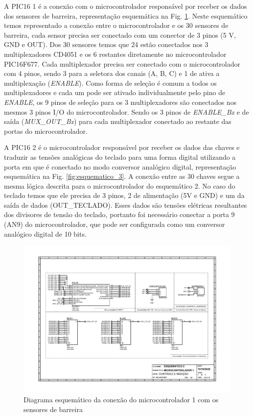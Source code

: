 \begin{apendicesenv}
A PIC16 1 é a conexão com o microcontrolador  responsável por receber os dados dos sensores de barreira, representação esquemática na Fig. \ref{fig:esquematico_2}. Neste esquemático temos representado a conexão entre o microcontrolador e os 30 sensores de barreira, cada sensor precisa ser conectado com um conector de 3 pinos (5 V, GND e OUT). Dos 30 sensores temos que 24 estão conectados nos 3 multiplexadores CD4051 e os 6 restantes diretamente no microcontrolador PIC16F677. Cada multiplexador precisa ser conectado com o microcontrolador com 4 pinos, sendo 3 para a seletora dos canais (A, B, C) e 1 de ativa a multiplexação (\textit{ENABLE}). Como forma de seleção é comum a todos os multiplexadores e cada um pode ser ativado  individualmente pelo pino de \textit{ENABLE}, os 9 pinos de seleção para os 3 multiplexadores são conectados nos mesmos 3 pinos I/O do microcontrolador. Sendo os 3 pinos de \textit{ENABLE\_Bx} e de saída (\textit{MUX\_OUT\_Bx}) para cada multiplexador conectado ao restante das portas do microcontrolador.

A PIC16 2 é o microcontrolador responsável por receber os dados das chaves e traduzir as tensões analógicas do teclado para uma forma digital utilizando a porta em que é conectado no modo conversor analógico digital, representação esquemática na Fig. \ref{fig:esquematico_3}. A conexão entre as 30 chaves segue a mesma lógica descrita para o microcontrolador do esquemático 2. No caso do teclado temos que ele precisa de 3 pinos, 2 de alimentação (5V e GND) e um da saída de dados (OUT\_TECLADO). Esses dados são tensões elétricas resultantes dos divisores de tensão do teclado, portanto foi necessário conectar a porta 9 (AN9) do microcontrolador, que pode ser configurada como um conversor analógico digital de 10 bits.


\begin{landscape}
\begin{figure}[H]
    \centering
    \includegraphics[width=1.25\textwidth, height=2\textheight,keepaspectratio]{figuras/eletronica/esquematicos/esquematico_2_micro1.pdf}
    \caption{Diagrama esquemático da conexão do microcontrolador 1 com os sensores de barreira}
    \label{fig:esquematico_2}
\end{figure}
\end{landscape}


\end{apendicesenv}

